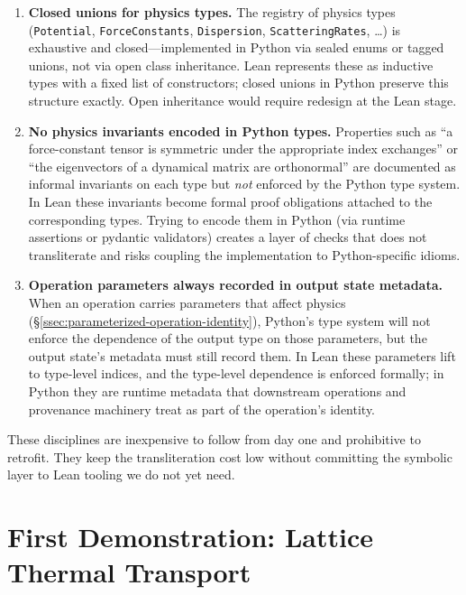 \documentclass[11pt,a4paper]{article}
\begin{document}
\begin{enumerate}[leftmargin=2em]
  \item \textbf{Closed unions for physics types.} The registry of physics types
        (\texttt{Potential}, \texttt{ForceConstants}, \texttt{Dispersion},
        \texttt{ScatteringRates}, \ldots) is exhaustive and closed---implemented in Python via
        sealed enums or tagged unions, not via open class inheritance. Lean represents these as
        inductive types with a fixed list of constructors; closed unions in Python preserve this
        structure exactly. Open inheritance would require redesign at the Lean stage.
  \item \textbf{No physics invariants encoded in Python types.} Properties such as ``a
        force-constant tensor is symmetric under the appropriate index exchanges'' or ``the
        eigenvectors of a dynamical matrix are orthonormal'' are documented as informal
        invariants on each type but \emph{not} enforced by the Python type system. In Lean these
        invariants become formal proof obligations attached to the corresponding types. Trying
        to encode them in Python (via runtime assertions or pydantic validators) creates a layer
        of checks that does not transliterate and risks coupling the implementation to
        Python-specific idioms.
  \item \textbf{Operation parameters always recorded in output state metadata.} When an operation
        carries parameters that affect physics (\S\ref{ssec:parameterized-operation-identity}),
        Python's type system will not enforce the dependence of the output type on those
        parameters, but the output state's metadata must still record them. In Lean these
        parameters lift to type-level indices, and the type-level dependence is enforced
        formally; in Python they are runtime metadata that downstream operations and provenance
        machinery treat as part of the operation's identity.
\end{enumerate}

These disciplines are inexpensive to follow from day one and prohibitive to retrofit. They keep
the transliteration cost low without committing the symbolic layer to Lean tooling we do not yet
need.


\section{First Demonstration: Lattice Thermal Transport}
\label{sec:demo}
\end{document}
